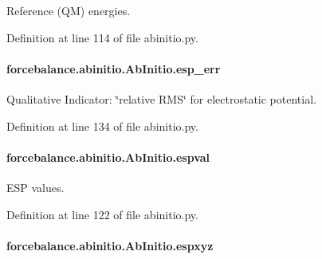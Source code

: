Reference (Q\-M) energies. 



Definition at line 114 of file abinitio.\-py.

\hypertarget{classforcebalance_1_1abinitio_1_1AbInitio_abdc625c3149cee375b56b4e0d73034fe}{
\paragraph[{esp\-\_\-err}]{\setlength{\rightskip}{0pt plus 5cm}forcebalance.\-abinitio.\-Ab\-Initio.\-esp\-\_\-err\hspace{0.3cm}{\ttfamily [inherited]}}}\label{classforcebalance_1_1abinitio_1_1AbInitio_abdc625c3149cee375b56b4e0d73034fe}


Qualitative Indicator\-: \char`\"{}relative R\-M\-S\char`\"{} for electrostatic potential. 



Definition at line 134 of file abinitio.\-py.

\hypertarget{classforcebalance_1_1abinitio_1_1AbInitio_aba6d885086d455fce8c3d472fd08020d}{
\paragraph[{espval}]{\setlength{\rightskip}{0pt plus 5cm}forcebalance.\-abinitio.\-Ab\-Initio.\-espval\hspace{0.3cm}{\ttfamily [inherited]}}}\label{classforcebalance_1_1abinitio_1_1AbInitio_aba6d885086d455fce8c3d472fd08020d}


E\-S\-P values. 



Definition at line 122 of file abinitio.\-py.

\hypertarget{classforcebalance_1_1abinitio_1_1AbInitio_a8be2d088afb344036aae989ca3cbcc41}{
\paragraph[{espxyz}]{\setlength{\rightskip}{0pt plus 5cm}forcebalance.\-abinitio.\-Ab\-Initio.\-espxyz\hspace{0.3cm}{\ttfamily [inherited]}}}\label{classforcebalance_1_1abinitio_1_1AbInitio_a8be2d088afb344036aae989ca3cbcc41}


